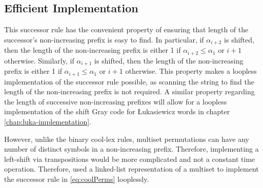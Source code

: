 \subsection{Efficient Implementation}
This successor rule has the convenient property of ensuring that length of the successor's non-increasing prefix is easy to find.
In particular, if $\alpha_{i+2}$ is shifted, then the length of the non-increasing prefix is either 1 if $\alpha_{i+2}\le \alpha_1$ or $i+1$ otherwise. 
Similarly, if $\alpha_{i+1}$ is shifted, then the length of the non-increasing prefix is either 1 if $\alpha_{i+1}\le \alpha_1$ or $i+1$ otherwise. 
This property makes a loopless implementation of the successor rule possible, as scanning the string to find the length of the non-increasing prefix is not required.  
A similar property regarding the length of successive non-increasing prefixes will allow for a loopless implementation of the shift Gray code for Łukasiewicz words in chapter \ref{chap:luka-implementation}.

However, unlike the binary cool-lex rules, multiset permutations can have any number of distinct symbols in a non-increasing prefix.  Therefore, implementing a left-shift via transpositions would be more complicated and  not a constant time operation.  Therefore, \cite{williams2009loopless} used a linked-list representation of a multiset to implement the successor rule in \eqref{eq:coolPerms} looplessly.



